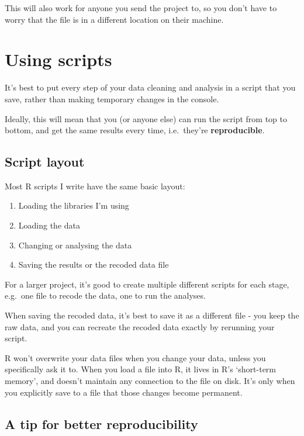 \documentclass[
]{book}
\providecommand{\tightlist}{%
  \setlength{\itemsep}{0pt}\setlength{\parskip}{0pt}}
\begin{document}
This will also work for anyone you send the project to, so you don't
have to worry that the file is in a different location on their machine.

\hypertarget{using-scripts}{%
\section{Using scripts}\label{using-scripts}}

It's best to put every step of your data cleaning and analysis
in a script that you save, rather than making temporary changes
in the console.

Ideally, this will mean that you (or anyone else) can run the script
from top to bottom, and get the same results every time, i.e.~they're
\textbf{reproducible}.

\hypertarget{script-layout}{%
\subsection{Script layout}\label{script-layout}}

Most R scripts I write have the same basic layout:

\begin{enumerate}
\def\labelenumi{\arabic{enumi}.}
\tightlist
\item
  Loading the libraries I'm using
\item
  Loading the data
\item
  Changing or analysing the data
\item
  Saving the results or the recoded data file
\end{enumerate}

For a larger project, it's good to create multiple different scripts for
each stage, e.g.~one file to recode the data, one to run the analyses.

When saving the recoded data, it's best to save it as a different file -
you keep the raw data, and you can recreate the recoded data
exactly by rerunning your script.

\begin{note}
R won't overwrite your data files when you change your data, unless you
specifically ask it to. When you load a file into R, it lives in R's
`short-term memory', and doesn't maintain any connection to the file on
disk. It's only when you explicitly save to a file that those changes
become permanent.
\end{note}

\hypertarget{a-tip-for-better-reproducibility}{%
\subsection{A tip for better reproducibility}\label{a-tip-for-better-reproducibility}}
\end{document}
